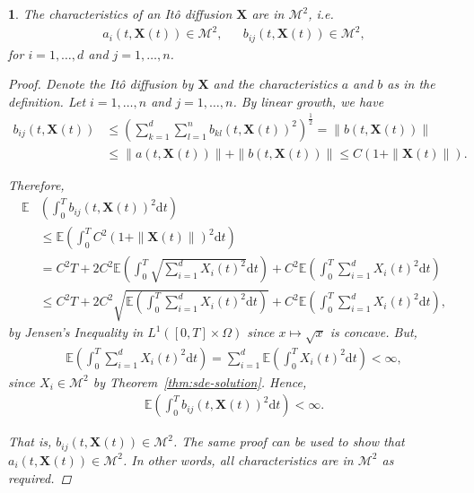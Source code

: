\documentclass[english]{article}
\numberwithin{equation}{section}
\numberwithin{figure}{section}
\theoremstyle{bolddescit}
\theoremstyle{definition}
\theoremstyle{definition}
\theoremstyle{plain}
\newtheorem{lemma}[theorem]{\protect\lemmaname}
\theoremstyle{plain}
\theoremstyle{bolddesc}
\theoremstyle{plain}
\theoremstyle{remark}
\providecommand{\lemmaname}{Lemma}
\begin{document}
\begin{lemma}\label{lem:ito-diffusion-characteristics-m2}
  The characteristics of an It\^o diffusion $\mathbf{X}$ are in $\mathcal{M}^2$, i.e.
  \begin{align*}
    a_i(t,\mathbf{X}(t)) \in \mathcal{M}^2, &&
    b_{ij}(t,\mathbf{X}(t)) \in \mathcal{M}^2,
  \end{align*}
  for $i=1,\ldots,d$ and $j=1,\ldots,n$.

  \begin{proof}
    Denote the It\^o diffusion by $\mathbf{X}$ and the characteristics $a$ and $b$ as in the definition. Let $i=1,\ldots,n$ and $j=1,\ldots,n$. By linear growth, we have
    \begin{align*}
      b_{ij}(t,\mathbf{X}(t))
      &\le \left( \sum_{k=1}^d \sum_{l=1}^n b_{kl}(t,\mathbf{X}(t))^2 \right)^{\frac{1}{2}}
      = \|b(t,\mathbf{X}(t))\|\\
      &\le \|a(t,\mathbf{X}(t))\| + \|b(t,\mathbf{X}(t))\|
      \le C (1 + \|\mathbf{X}(t)\|).
    \end{align*}

    Therefore,
    \begin{align*}
      \mathbb{E} &\left( \int_0^T b_{ij}(t,\mathbf{X}(t))^2 \mathrm{d}t \right)\\
      &\le \mathbb{E} \left( \int_0^T C^2(1+\|\mathbf{X}(t)\|)^2 \mathrm{d}t \right)\\
      &= C^2 T + 2 C^2 \mathbb{E} \left( \int_0^T \sqrt{\sum_{i=1}^d X_i(t)^2} \mathrm{d}t \right) + C^2 \mathbb{E} \left( \int_0^T \sum_{i=1}^d X_i(t)^2 \mathrm{d}t \right)\\
      &\le C^2 T + 2 C^2 \sqrt{\mathbb{E} \left( \int_0^T \sum_{i=1}^d X_i(t)^2 \mathrm{d}t \right)} + C^2 \mathbb{E} \left( \int_0^T \sum_{i=1}^d X_i(t)^2 \mathrm{d}t \right),
    \end{align*}
    by Jensen's Inequality in $L^1([0,T] \times \Omega)$ since $x \mapsto \sqrt{x}$ is concave. But,
    \begin{align*}
      \mathbb{E} \left( \int_0^T \sum_{i=1}^d X_i(t)^2 \mathrm{d}t \right)
      = \sum_{i=1}^d \mathbb{E} \left( \int_0^T X_i(t)^2 \mathrm{d}t \right) < \infty,
    \end{align*}
    since $X_i \in \mathcal{M}^2$ by Theorem~\ref{thm:sde-solution}. Hence,
    \begin{align*}
      \mathbb{E} \left( \int_0^T b_{ij}(t,\mathbf{X}(t))^2 \mathrm{d}t \right) < \infty.
    \end{align*}

    That is, $b_{ij}(t,\mathbf{X}(t)) \in \mathcal{M}^2$. The same proof can be used to show that $a_i(t,\mathbf{X}(t)) \in \mathcal{M}^2$. In other words, all characteristics are in $\mathcal{M}^2$ as required.
  \end{proof}
\end{lemma}
\end{document}
